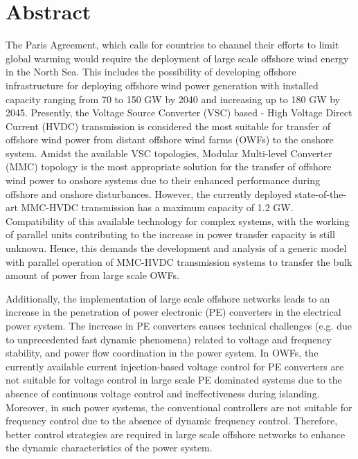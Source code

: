 \chapter*{Abstract}



The Paris Agreement, which calls for countries to channel their efforts to limit global warming would require the deployment of large scale offshore wind energy in the North Sea. This includes the possibility of developing offshore infrastructure for deploying offshore wind power generation with installed capacity ranging from 70 to 150 GW by 2040 and increasing up to 180 GW by 2045. Presently, the Voltage Source Converter (VSC) based - High Voltage Direct Current (HVDC) transmission is considered the most suitable for transfer of offshore wind power from distant offshore wind farms (OWFs) to the onshore system. Amidst the available VSC topologies, Modular Multi-level Converter (MMC) topology is the most appropriate solution for the transfer of offshore wind power to onshore systems due to their enhanced performance during offshore and onshore disturbances. However, the currently deployed state-of-the-art MMC-HVDC transmission has a maximum capacity of 1.2 GW. Compatibility of this available technology for complex systems, with the working of parallel units contributing to the increase in power transfer capacity is still unknown. Hence, this demands the development and analysis of a generic model with parallel operation of MMC-HVDC transmission systems to transfer the bulk amount of power from large scale OWFs. 

Additionally, the implementation of large scale offshore networks leads to an increase in the penetration of power electronic (PE) converters in the electrical power system. The increase in PE converters causes technical challenges (e.g. due to unprecedented fast dynamic phenomena) related to voltage and frequency stability, and power flow coordination in the power system. In OWFs, the currently available current injection-based voltage control for PE converters are not suitable for voltage control in large scale PE dominated systems due to the absence of continuous voltage control and ineffectiveness during islanding. Moreover, in such power systems, the conventional controllers are not suitable for frequency control due to the absence of dynamic frequency control. Therefore, better control strategies are required in large scale offshore networks to enhance the dynamic characteristics of the power system. 

